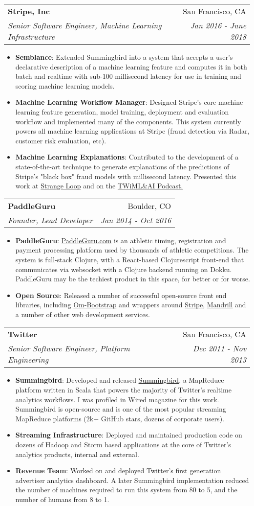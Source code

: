 \documentclass[letterpaper,11pt]{article}
\makeatletter
\newcommand{\resumeItem}[2]{\item\small{
    \textbf{#1}{: #2 \vspace{-2pt}}
  }
}
\newcommand{\resumeSubheading}[4]{
  \vspace{-1pt}\item[]\begin{tabular*}{0.97\textwidth}[t]{l@{\extracolsep{\fill}}r}
    \textbf{#1} & #2 \\
    \textit{\small#3} & \textit{\small #4} \\
  \end{tabular*}\vspace{-5pt}
}
\newcommand{\resumeItemListStart}{\begin{itemize}}
\newcommand{\resumeItemListEnd}{\end{itemize}\vspace{-5pt}}
\makeatother
\begin{document}
\resumeSubheading{Stripe, Inc}{San Francisco, CA}{
  Senior Software Engineer, Machine Learning Infrastructure}{Jan 2016 - June 2018}
\resumeItemListStart{}
\resumeItem{Semblance}{
  Extended Summingbird into a system that accepts a user's declarative description of a machine learning feature and computes it in both batch and realtime with sub-100 millisecond latency for use in training and scoring machine learning models.}
\resumeItem{Machine Learning Workflow Manager}{
  Designed Stripe's core machine learning feature generation, model training, deployment and evaluation workflow and implemented many of the components. This system currently powers all machine learning applications at Stripe (fraud detection via Radar, customer risk evaluation, etc).}
\resumeItem{Machine Learning Explanations}{
  Contributed to the development of a state-of-the-art technique to generate explanations of the predictions of Stripe's "black box" fraud models with millisecond latency. Presented this work at \href{https://www.youtube.com/watch?v=DiWkKqZChF0}{Strange Loop} and on the \href{https://twimlai.com/twiml-talk-73-exploring-black-box-predictions-sam-ritchie/}{TWiML\&AI Podcast.}}
\resumeItemListEnd{}

\resumeSubheading{PaddleGuru}{Boulder, CO}{
  Founder, Lead Developer}{Jan 2014 - Oct 2016}
\resumeItemListStart{}
\resumeItem{PaddleGuru}{
  \href{https://paddleguru.com}{PaddleGuru.com} is an athletic timing, registration and payment processing platform used by thousands of athletic competitions. The system is full-stack Clojure, with a React-based Clojurescript front-end that communicates via websocket with a Clojure backend running on Dokku. PaddleGuru may be the techiest product in this space, for better or for worse.}
\resumeItem{Open Source}{
  Released a number of successful open-source front end libraries, including \href{https://github.com/racehub/om-bootstrap}{Om-Bootstrap} and wrappers around \href{https://github.com/racehub/stripe-clj}{Stripe}, \href{https://github.com/racehub/mandrill-clj}{Mandrill} and a number of other web development services.}
\resumeItemListEnd{}

\resumeSubheading{Twitter}{San Francisco, CA}{
  Senior Software Engineer, Platform Engineering}{Dec 2011 - Nov 2013}
\resumeItemListStart{}
\resumeItem{Summingbird}{
  Developed and released \href{https://github.com/twitter/summingbird}{Summingbird}, a MapReduce platform written in Scala that powers the majority of Twitter's realtime analytics workflows. I was \href{https://www.wired.com/2013/11/twitter-summingbird/}{profiled in Wired magazine} for this work. Summingbird is open-source and is one of the most popular streaming MapReduce platforms (2k+ GitHub stars, dozens of corporate users).}
\resumeItem{Streaming Infrastructure}{
  Deployed and maintained production code on dozens of Hadoop and Storm based applications at the core of Twitter's analytics products, internal and external.}
\resumeItem{Revenue Team}{
  Worked on and deployed Twitter's first generation advertiser analytics dashboard. A later Summingbird implementation reduced the number of machines required to run this system from 80 to 5, and the number of humans from 8 to 1.}
\resumeItemListEnd{}
\end{document}
